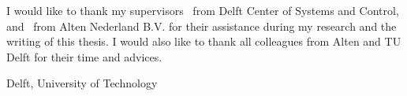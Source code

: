 \documentclass[a4paper,11pt]{mscThesis}
\begin{document}
%
\frontmatter %
%
 \maketitle
%

%
    I would like to thank my supervisors \mscreaderone\ from Delft Center of Systems and Control, and \mscreadertwo\ from Alten Nederland B.V. for their assistance during my research and the writing of this thesis. I would also like to thank all colleagues from Alten and TU Delft for their time and advices.
    \vspace*{15mm}

    \noindent
    Delft, University of Technology \hfill \mscname\\
    \mscdate

%
    \tocloflot
%
    
    \cleardoublepage%
%
%
\mainmatter
%
%
%





%



%

%


	
\appendix



\backmatter
	
	
	
	
	
	\printindex

	\printnomenclature




\end{document}
